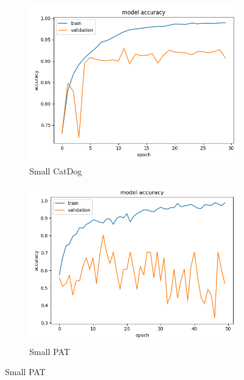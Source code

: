 \begin{figure}
\centering
\begin{subfigure}[b]{.45\linewidth}
\includegraphics[width=\linewidth]{Figs/small_catdog_acc.jpg}
\caption{Small CatDog}
\end{subfigure}
\begin{subfigure}[b]{.45\linewidth}
\includegraphics[width=\linewidth]{Figs/small_pat_acc.jpg}
\caption{Small PAT}
\end{subfigure}


\end{figure}
